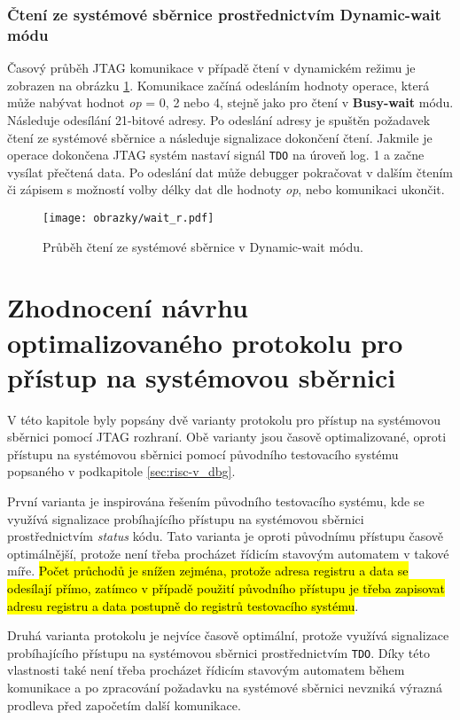 \subsubsection{Čtení ze systémové sběrnice prostřednictvím Dynamic-wait módu}
Časový průběh JTAG komunikace v případě čtení v dynamickém režimu je zobrazen na obrázku \ref{fig:wait_r}. Komunikace začíná odesláním hodnoty operace, která může nabývat hodnot \textit{op} = 0, 2 nebo 4, stejně jako pro čtení v \textbf{Busy-wait} módu. Následuje odesílání 21-bitové adresy. Po odeslání adresy je spuštěn požadavek čtení ze systémové sběrnice a následuje signalizace dokončení čtení. Jakmile je operace dokončena \acs{JTAG} systém nastaví signál \texttt{\acs{TDO}} na úroveň log. 1 a začne vysílat přečtená data. Po odeslání dat může debugger pokračovat v dalším čtením či zápisem s možností volby délky dat dle hodnoty \textit{op}, nebo komunikaci ukončit. 

\begin{figure}[!h]
  \begin{center}
    \texttt{[image: obrazky/wait\_r.pdf]}
  \end{center}
  \caption{Průběh čtení ze systémové sběrnice v Dynamic-wait módu.}
	\label{fig:wait_r}
\end{figure}

\section{Zhodnocení návrhu optimalizovaného protokolu pro přístup na systémovou sběrnici}
V této kapitole byly popsány dvě varianty protokolu pro přístup na systémovou sběrnici pomocí \acs{JTAG} rozhraní. Obě varianty jsou časově optimalizované, oproti přístupu na systémovou sběrnici pomocí původního testovacího systému popsaného v podkapitole \ref{sec:risc-v_dbg}.

První varianta je inspirována řešením původního testovacího systému, kde se využívá signalizace probíhajícího přístupu na systémovou sběrnici prostřednictvím \textit{status} kódu. Tato varianta je oproti původnímu přístupu časově optimálnější, protože není třeba procházet řídicím stavovým automatem v takové míře. \hl{Počet průchodů je snížen zejména, protože adresa registru a data se odesílají přímo, zatímco v případě použití původního přístupu je třeba zapisovat adresu registru a data postupně do registrů testovacího systému}.

Druhá varianta protokolu je nejvíce časově optimální, protože využívá signalizace probíhajícího přístupu na systémovou sběrnici prostřednictvím \texttt{\acs{TDO}}. Díky této vlastnosti také není třeba procházet řídicím stavovým automatem během komunikace a po zpracování požadavku na systémové sběrnici nevzniká výrazná prodleva před započetím další komunikace.

